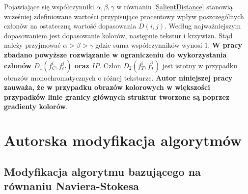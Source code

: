 \documentclass[12pt, twoside, openany]{report}
\theoremstyle{definition}
\begin{document}
Pojawiające się współczynniki $\alpha ,\beta ,\gamma $ w równaniu \eqref{SalientDistance} stanowią wcześniej zdefiniowane wartości przypisujące procentowy wpływ poszczególnych członów na ostateczną wartość dopasowania $D(i,j)$. Według \cite{SalientStrucTexProp} najważniejszym dopasowaniem jest dopasowanie kolorów, następnie tekstur i krzywizn. Stąd należy przyjmować $\alpha >\beta >\gamma $ gdzie suma współczynników wynosi 1. \textbf{W pracy zbadano powyższe rozwiązanie w ograniczeniu do wykorzystania członów $D_1\left(f^i_C,f^j_C\right)$ oraz $IP$}. Człon $D_2\left(f^i_T,f^j_T\right)$ jest istotny w przypadku obrazów monochromatycznych o różnej teksturze. \textbf{Autor niniejszej pracy zauważa, że w przypadku obrazów kolorowych w większości przypadków linie granicy głównych struktur tworzone są poprzez gradienty kolorów}.
\chapter{Autorska modyfikacja algorytmów}
\section{Modyfikacja algorytmu bazującego na równaniu Naviera-Stokesa}
\end{document}
